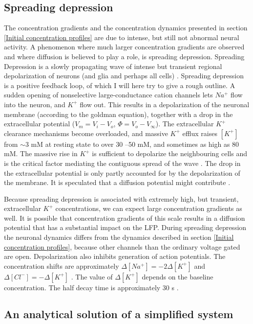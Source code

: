 \documentclass{article}
\begin{document}
\subsection{Spreading depression}\label{SD}
The concentration gradients and the concentration dynamics presented in section \ref{Initial concentration profiles} are due to intense, but still not abnormal neural activity. A phenomenon where much larger concentration gradients are observed and where diffusion is believed to play a role, is spreading depression. Spreading Depression is a slowly propagating wave of intense but transient
regional depolarization of neurons (and glia and perhaps all cells) \cite{Ataya2015}. Spreading depression is a positive feedback loop, of which I will here try to give a rough outline. A sudden opening of nonselective large-conductance cation channels lets $Na^+$ flow into the neuron, and $K^+$ flow out. This results in a depolarization of the neuronal membrane (according to the goldman equation), together with a drop in the extracellular potential ($V_m=V_i-V_o$, $\Phi = V_o - V_{\infty}$). The extracellular $K^+$ clearance mechanisms become overloaded, and massive $K^+$ efflux raises $[K^+]$ from $ \sim 3$ mM at resting state
to over 30 –50 mM, and sometimes as
high as 80 mM. The massive rise in $K^+$ is sufficient to depolarize the neighbouring cells and is the critical factor mediating the contiguous spread of
the wave \cite{Ataya2015}. The drop in the extracellular potential is only partly accounted for by the depolarization of the membrane. It is speculated that a diffusion potential might contribute \cite{Herreras1993}. 


Because spreading depression is associated with extremely high, but transient, extracellular $K^+$ concentrations, we can expect large concentration gradients as well. It is possible that concentration gradients of this scale results in a diffusion potential that has a substantial impact on the LFP. During spreading depression the neuronal dynamics differs from the dynamics described in section \ref{Initial concentration profiles}, because other channels than the ordinary voltage gated are open. Depolarization also inhibits generation of action potentials. The concentration shifts are approximately $\Delta [Na^+] = -2\Delta [K^+]$ and $\Delta [Cl^-] = -\Delta[K^+]$ \cite{Herreras1993} \cite{Ataya2015}. The value of $\Delta [K^+]$ depends on the baseline concentration. The half decay time is approximately 30 s \cite{Ataya2015}.

\subsection{An analytical solution of a simplified system}
\end{document}
